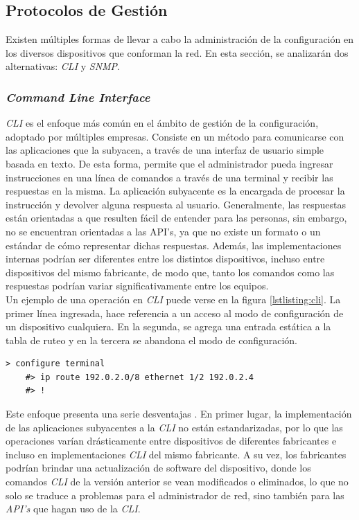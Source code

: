 \subsection{Protocolos de Gestión}
Existen múltiples formas de llevar a cabo la administración de la configuración en los diversos dispositivos que conforman la red. En esta sección, se analizarán dos alternativas: \textit{CLI} y \textit{SNMP}.

\subsubsection{\textit{Command Line Interface}}

\textit{CLI} es el enfoque más común en el ámbito de gestión de la configuración, adoptado por múltiples empresas. Consiste en un método para comunicarse con las aplicaciones que la subyacen, a través de una interfaz de usuario simple basada en texto. De esta forma, permite que el administrador pueda ingresar instrucciones en una línea de comandos a través de una terminal y recibir las respuestas en la misma. La aplicación subyacente es la encargada de procesar la instrucción y devolver alguna respuesta al usuario. Generalmente, las respuestas están orientadas a que resulten fácil de entender para las personas, sin embargo, no se encuentran orientadas a las API’s, ya que no existe un formato o un estándar de cómo representar dichas respuestas. Además, las implementaciones internas podrían ser diferentes entre los distintos dispositivos, incluso entre dispositivos del mismo fabricante, de modo que, tanto los comandos como las respuestas podrían variar significativamente entre los equipos.
\\

Un ejemplo de una operación en \textit{CLI} puede verse en la figura \ref{lstlisting:cli}. La primer línea ingresada, hace referencia a un acceso al modo de configuración de un dispositivo cualquiera. En la segunda, se agrega una entrada estática a la tabla de ruteo y en la tercera se abandona el modo de configuración.

\begin{lstlisting}[language=SHELXL, caption=Interacción tipica con un dispositivo mediante \textit{CLI}., label=lstlisting:cli]
	> configure terminal
	#> ip route 192.0.2.0/8 ethernet 1/2 192.0.2.4
	#> !
\end{lstlisting}


  Este enfoque presenta una serie desventajas \parencite{clilimitacion}. En primer lugar, la implementación de las aplicaciones subyacentes a la \textit{CLI} no están estandarizadas, por lo que las operaciones varían drásticamente entre dispositivos de diferentes fabricantes e incluso en implementaciones \textit{CLI} del mismo fabricante. A su vez, los fabricantes podrían brindar una actualización de software del dispositivo, donde los comandos \textit{CLI} de la versión anterior se vean modificados o eliminados, lo que no solo se traduce a problemas para el administrador de red, sino también para las \textit{API’s} que hagan uso de la \textit{CLI}. 
  \\

